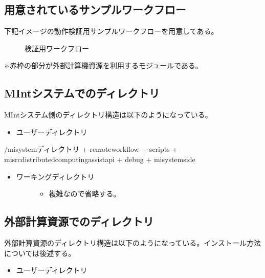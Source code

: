 \documentclass[letterpaper,10pt,dvipdfmx,openany]{sphinxmanual}
\begin{document}
\subsection{用意されているサンプルワークフロー}
\label{\detokenize{using_distributed_properties:id19}}
下記イメージの動作検証用サンプルワークフローを用意してある。

\begin{figure}[htbp]
\centering
\capstart

\noindent{}
\caption{検証用ワークフロー}\label{\detokenize{using_distributed_properties:id47}}\end{figure}

※赤枠の部分が外部計算機資源を利用するモジュールである。

\newpage


\subsection{MIntシステムでのディレクトリ}
\label{\detokenize{using_distributed_properties:id20}}
MIntシステム側のディレクトリ構造は以下のようになっている。
\begin{itemize}
\item {} 
ユーザーディレクトリ

\end{itemize}

\begin{sphinxVerbatim}[commandchars=\\\{\}]
\PYGZti{}/misystemディレクトリ
 + remote\PYGZus{}workflow
   + scripts
 + misrc\PYGZus{}distributed\PYGZus{}computing\PYGZus{}assist\PYGZus{}api
   + debug
     + mi\PYGZhy{}system\PYGZhy{}side
\end{sphinxVerbatim}
\begin{itemize}
\item {} \begin{description}
\item[{ワーキングディレクトリ}] \leavevmode\begin{itemize}
\item {} 
複雑なので省略する。

\end{itemize}

\end{description}

\end{itemize}


\subsection{外部計算資源でのディレクトリ}
\label{\detokenize{using_distributed_properties:id21}}
外部計算資源のディレクトリ構造は以下のようになっている。インストール方法については後述する。
\begin{itemize}
\item {} 
ユーザーディレクトリ

\end{itemize}
\end{document}
